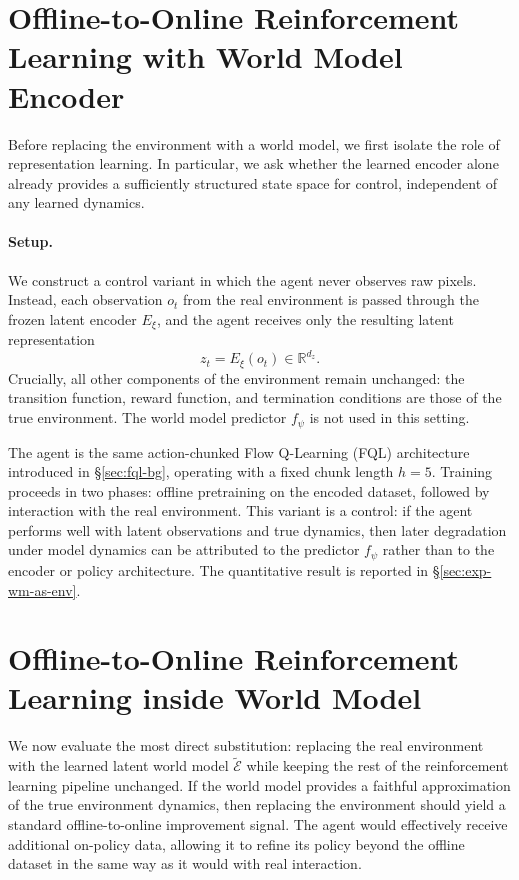 \section{Offline-to-Online Reinforcement Learning with World Model Encoder}
\label{sec:wmep-latent-obs}

Before replacing the environment with a world model, we first isolate the role of
representation learning. In particular, we ask whether the learned encoder alone
already provides a sufficiently structured state space for control, independent of
any learned dynamics.

\paragraph{Setup.}
We construct a control variant in which the agent never observes raw pixels.
Instead, each observation $o_t$ from the real environment is passed through
the frozen latent encoder $E_\xi$, and the agent receives only the resulting latent
representation
\[
z_t = E_\xi(o_t) \in \mathbb{R}^{d_z}.
\]
Crucially, all other components of the environment remain unchanged: the transition
function, reward function, and termination conditions are those of the true
environment. The world model predictor $f_\psi$ is not used in this setting.

The agent is the same action-chunked Flow Q-Learning (FQL) architecture introduced
in \S\ref{sec:fql-bg}, operating with a fixed chunk length $h=5$. Training proceeds
in two phases: offline pretraining on the encoded dataset, followed by interaction
with the real environment. This variant is a control: if the agent performs well
with latent observations and true dynamics, then later degradation under model
dynamics can be attributed to the predictor $f_\psi$ rather than to the encoder or
policy architecture. The quantitative result is reported in \S\ref{sec:exp-wm-as-env}.

\section{Offline-to-Online Reinforcement Learning inside World Model}
\label{sec:wmep-exp1}

We now evaluate the most direct substitution: replacing the real environment with
the learned latent world model $\widetilde{\mathcal{E}}$ while keeping the rest of
the reinforcement learning pipeline unchanged.
If the world model provides a faithful approximation of the true environment
dynamics, then replacing the environment should yield a standard offline-to-online
improvement signal. The agent would effectively receive additional on-policy data,
allowing it to refine its policy beyond the offline dataset in the same way as it
would with real interaction.

